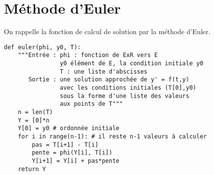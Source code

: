 \section{Méthode d'Euler}
On rappelle la fonction de calcul de solution par la méthode d'Euler.
\begin{lstlisting}
def euler(phi, y0, T):
    """Entrée : phi : fonction de ExR vers E 
                y0 élément de E, la condition initiale y0
                T : une liste d'abscisses
       Sortie : une solution approchée de y' = f(t,y)
                avec les conditions initiales (T[0],y0)
                sous la forme d'une liste des valeurs
                aux points de T"""
    n = len(T)
    Y = [0]*n
    Y[0] = y0 # ordonnée initiale
    for i in range(n-1): # il reste n-1 valeurs à calculer
        pas = T[i+1] - T[i]
        pente = phi(Y[i], T[i])  
        Y[i+1] = Y[i] + pas*pente
    return Y
\end{lstlisting}
